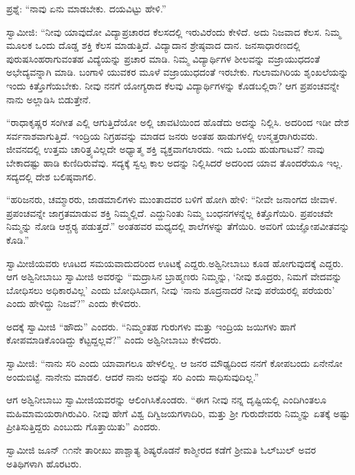 ಪ್ರಶ್ನೆ: “ನಾವು ಏನು ಮಾಡಬೇಕು. ದಯವಿಟ್ಟು ಹೇಳಿ.” 

 ಸ್ವಾಮೀಜಿ: “ನೀವು ಯಾವುದೋ ವಿದ್ಯಾಪ್ರಚಾರದ ಕೆಲಸದಲ್ಲಿ ಇರುವಿರೆಂದು ಕೇಳಿದೆ. ಅದು ನಿಜವಾದ ಕೆಲಸ. ನಿಮ್ಮ ಮೂಲಕ ಒಂದು ದೊಡ್ಡ ಶಕ್ತಿ ಕೆಲಸ ಮಾಡುತ್ತಿದೆ. ವಿದ್ಯಾದಾನ ಶ್ರೇಷ್ಠವಾದ ದಾನ. ಜನಸಾಧಾರಣದಲ್ಲಿ ಪುರುಷಸಿಂಹರಾಗುವಂತಹ ವಿದ್ಯೆಯನ್ನು ಪ್ರಚಾರ ಮಾಡಿ. ನಿಮ್ಮ ವಿದ್ಯಾರ್ಥಿಗಳ ಶೀಲವನ್ನು ವಜ್ರಾಯುಧದಂತೆ ಅಭೇದ್ಯವನ್ನಾಗಿ ಮಾಡಿ. ಬಂಗಾಳಿ ಯುವಕರ ಮೂಳೆ ವಜ್ರಾಯುಧದಂತೆ ಇರಬೇಕು. ಗುಲಾಮಗಿರಿಯ ಶೃಂಖಲೆಯನ್ನು ಇಂದು ಕಿತ್ತೊಗೆಯಬೇಕು. ನೀವು ನನಗೆ ಯೋಗ್ಯರಾದ ಕೆಲವು ವಿದ್ಯಾರ್ಥಿಗಳನ್ನು ಕೊಡಬಲ್ಲಿರಾ? ಆಗ ಪ್ರಪಂಚವನ್ನೇ ನಾನು ಅಲ್ಲಾಡಿಸಿ ಬಿಡುತ್ತೇನೆ. 

 “ರಾಧಾಕೃಷ್ಣರ ಸಂಗೀತ ಎಲ್ಲಿ ಆಗುತ್ತಿದೆಯೋ ಅಲ್ಲಿ ಚಾವಟಿಯಿಂದ ಹೊಡೆದು ಅದನ್ನು ನಿಲ್ಲಿಸಿ. ಅದರಿಂದ ಇಡೀ ದೇಶ ಸರ್ವನಾಶವಾಗುತ್ತಿದೆ. ಇಂದ್ರಿಯ ನಿಗ್ರಹವನ್ನು ಮಾಡದ ಜನರು ಅಂತಹ ಹಾಡುಗಳಲ್ಲಿ ಉನ್ಮತ್ತರಾಗಿರುವರು. ಜೀವನದಲ್ಲಿ ಉತ್ತಮ ಚಾರಿತ್ರ್ಯವಿಲ್ಲದೇ ಅಧ್ಯಾತ್ಮ ಶಕ್ತಿ ವ್ಯಕ್ತವಾಗಲಾರದು. ಇದು ಒಂದು ಹುಡುಗಾಟವೆ? ನಾವು ಬೇಕಾದಷ್ಟು ಹಾಡಿ ಕುಣಿದಿರುವೆವು. ಸದ್ಯಕ್ಕೆ ಸ್ವಲ್ಪ ಕಾಲ ಅದನ್ನು ನಿಲ್ಲಿಸಿದರೆ ಅದರಿಂದ ಯಾವ ತೊಂದರೆಯೂ ಇಲ್ಲ. ಸದ್ಯದಲ್ಲಿ ದೇಶ ಬಲಿಷ್ಠವಾಗಲಿ.

 “ಹರಿಜನರು, ಚಮ್ಮಾರರು, ಜಾಡಮಾಲಿಗಳು ಮುಂತಾದವರ ಬಳಿಗೆ ಹೋಗಿ ಹೇಳಿ: “ನೀವೇ ಜನಾಂಗದ ಜೀವಾಳ. ಪ್ರಪಂಚವನ್ನೇ ಜಾಗ್ರತಮಾಡುವ ಶಕ್ತಿ ನಿಮ್ಮಲ್ಲಿದೆ. ಎದ್ದುನಿಂತು ನಿಮ್ಮ ಬಂಧನಗಳನ್ನೆಲ್ಲ ಕಿತ್ತೊಗೆಯಿರಿ. ಪ್ರಪಂಚವೇ ನಿಮ್ಮನ್ನು ನೋಡಿ ಆಶ್ಚರ‍್ಯ ಪಡುತ್ತದೆ.” ಅಂತಹವರ ಮಧ್ಯದಲ್ಲಿ ಶಾಲೆಗಳನ್ನು ತೆಗೆಯಿರಿ. ಅವರಿಗೆ ಯಜ್ಞೋಪವೀತವನ್ನು ಕೊಡಿ.” 

 ಸ್ವಾಮೀಜಿಯವರು ಊಟದ ಸಮಯವಾದುದರಿಂದ ಊಟಕ್ಕೆ ಎದ್ದರು.\break ಅಶ್ವಿನೀಬಾಬು ಕೂಡ ಹೋಗುವುದಕ್ಕೆ ಎದ್ದರು. ಆಗ ಅಶ್ವಿನೀಬಾಬು ಸ್ವಾಮೀಜಿ ಅವರನ್ನು “ಮದ್ರಾಸಿನ ಬ್ರಾಹ್ಮಣರು ನಿಮ್ಮನ್ನು, ‘ನೀವು ಶೂದ್ರರು, ನಿಮಗೆ ವೇದವನ್ನು ಬೋಧಿಸಲು ಅಧಿಕಾರವಿಲ್ಲ’ ಎಂದು ಬೋಧಿಸಿದಾಗ, ನೀವು ‘ನಾನು ಶೂದ್ರನಾದರೆ ನೀವು ಪರೆಯರಲ್ಲಿ ಪರೆಯರು’ ಎಂದು ಹೇಳಿದ್ದು ನಿಜವೆ?” ಎಂದು ಕೇಳಿದರು. 

 ಅದಕ್ಕೆ ಸ್ವಾಮೀಜಿ “ಹೌದು” ಎಂದರು. “ನಿಮ್ಮಂತಹ ಗುರುಗಳು ಮತ್ತು ಇಂದ್ರಿಯ ಜಯಿಗಳು ಹಾಗೆ ಕೋಪಮಾಡಿಕೊಂಡಿದ್ದು ಕೆಟ್ಟದ್ದಲ್ಲವೆ?” ಎಂದು ಅಶ್ವಿನೀಬಾಬು ಕೇಳಿದರು. 

 ಸ್ವಾಮೀಜಿ: “ನಾನು ಸರಿ ಎಂದು ಯಾವಾಗಲೂ ಹೇಳಲಿಲ್ಲ. ಆ ಜನರ ಮೌಢ್ಯದಿಂದ ನನಗೆ ಕೋಪಬಂದು ಏನೇನೋ ಅಂದುಬಿಟ್ಟೆ. ನಾನೇನು ಮಾಡಲಿ. ಆದರೆ ನಾನು ಅದನ್ನು ಸರಿ ಎಂದು ಸಾಧಿಸುವುದಿಲ್ಲ.” 

 ಆಗ ಅಶ್ವಿನೀಬಾಬು ಸ್ವಾಮೀಜಿಯವರನ್ನು ಆಲಿಂಗಿಸಿಕೊಂಡರು. “ಈಗ ನೀವು ನನ್ನ ದೃಷ್ಟಿಯಲ್ಲಿ ಎಂದಿಗಿಂತಲೂ ಮಹಿಮಾಮಯರಾಗಿರುವಿರಿ. ನೀವು ಹೇಗೆ ವಿಶ್ವ ದಿಗ್ವಿಜಯಗಳಾದಿರಿ, ಮತ್ತು ಶ‍್ರೀ ಗುರುದೇವರು ನಿಮ್ಮನ್ನು ಏತಕ್ಕೆ ಅಷ್ಟು ಪ್ರೀತಿಸುತ್ತಿದ್ದರು ಎಂಬುದು ಗೊತ್ತಾಯಿತು” ಎಂದರು. 

 ಸ್ವಾಮೀಜಿ ಜೂನ್ ೧೧ನೇ ತಾರೀಖು ಪಾಶ್ಚಾತ್ಯ ಶಿಷ್ಯರೊಡನೆ ಕಾಶ್ಮೀರದ ಕಡೆಗೆ ಶ‍್ರೀಮತಿ ಓಲ್‍ಬುಲ್ ಅವರ ಅತಿಥಿಗಳಾಗಿ ಹೊರಟರು. 

